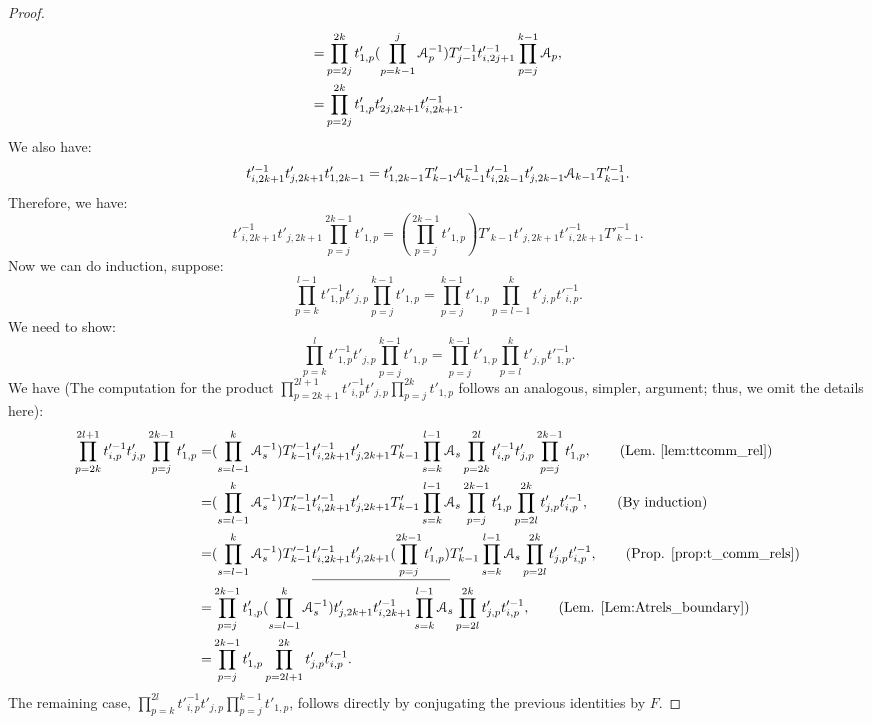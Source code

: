 \documentclass{amsart}
\begin{document}
\begin{proof}
\begin{align*}
=&\prod^{2k}_{p=2j}t'_{1,p}(\prod^{j}_{p=k-1}\AA^{-1}_p)T'^{-1}_{j-1}t'^{-1}_{i,2j+1}\prod^{k-1}_{p=j}\AA_p, \\
=&\prod^{2k}_{p=2j}t'_{1,p}t'_{2j,2k+1}t'^{-1}_{i,2k+1}.   
\end{align*}
We also have:
\[
\begin{aligned}
t'^{-1}_{i,2k+1}t'_{j,2k+1}t'_{1,2k-1}=t'_{1,2k-1}T'_{k-1}\AA^{-1}_{k-1}t'^{-1}_{i,2k-1}t'_{j,2k-1}\AA_{k-1}T'^{-1}_{k-1}.
\end{aligned}
\]
Therefore, we have:
\[
t'^{-1}_{i,2k+1}t'_{j,2k+1}\prod^{2k-1}_{p=j}t'_{1,p}=(\prod^{2k-1}_{p=j}t'_{1,p})T'_{k-1}t'_{j,2k+1}t'^{-1}_{i,2k+1}T'^{-1}_{k-1}.
\]
Now we can do induction, suppose: 
\[
\prod^{l-1}_{p=k}t'^{-1}_{1,p}t'_{j,p}\prod^{k-1}_{p=j}t'_{1,p}=\prod^{k-1}_{p=j}t'_{1,p}\prod^{k}_{p=l-1}t'_{j,p}t'^{-1}_{i,p}.
\]
We need to show:
\[
\prod^{l}_{p=k}t'^{-1}_{1,p}t'_{j,p}\prod^{k-1}_{p=j}t'_{1,p}=\prod^{k-1}_{p=j}t'_{1,p}\prod^{k}_{p=l}t'_{j,p}t'^{-1}_{1,p}.    
\]
We have (The computation for the product $\prod^{2l+1}_{p=2k+1}t'^{-1}_{i,p}t'_{j,p}\prod^{2k}_{p=j}t'_{1,p}$ follows an analogous, simpler, argument; thus, we omit the details here):
\[
\begin{aligned}
\prod^{2l+1}_{p=2k}t'^{-1}_{i,p}t'_{j,p}\prod^{2k-1}_{p=j}t'_{1,p}=&(\prod ^{k}_{s=l-1}\AA^{-1}_s)T'^{-1}_{k-1}t'^{-1}_{i,2k+1}t'_{j,2k+1}T'_{k-1}\prod ^{l-1}_{s=k}\AA_s\prod^{2l}_{p=2k}t'^{-1}_{i,p}t'_{j,p}\prod^{2k-1}_{p=j}t'_{1,p},\qquad(\text{Lem.~\ref{lem:ttcomm_rel}})\\
=&(\prod ^{k}_{s=l-1}\AA^{-1}_s)T'^{-1}_{k-1}t'^{-1}_{i,2k+1}t'_{j,2k+1}T'_{k-1}\prod ^{l-1}_{s=k}\AA_s\prod^{2k-1}_{p=j}t'_{1,p} \prod^{2k}_{p=2l}t'_{j,p}t'^{-1}_{i,p},\qquad \text{(By induction)}\\
=&(\prod ^{k}_{s=l-1}\AA^{-1}_s)T'^{-1}_{k-1}\underline{t'^{-1}_{i,2k+1}t'_{j,2k+1}(\prod^{2k-1}_{p=j}t'_{1,p})}T'_{k-1}\prod ^{l-1}_{s=k}\AA_s \prod^{2k}_{p=2l}t'_{j,p}t'^{-1}_{i,p},\qquad \text{(Prop. \ref{prop:t_comm_rels})}\\
=&\prod^{2k-1}_{p=j}t'_{1,p}(\prod ^{k}_{s=l-1}\AA^{-1}_s)t'_{j,2k+1}t'^{-1}_{i,2k+1}\prod ^{l-1}_{s=k}\AA_s \prod^{2k}_{p=2l}t'_{j,p}t'^{-1}_{i,p}, \qquad \text{(Lem. \ref{Lem:Atrels_boundary})}\\
=&\prod^{2k-1}_{p=j}t'_{1,p}\prod^{2k}_{p=2l+1}t'_{j,p}t'^{-1}_{i,p}.
\end{aligned}
\]
The remaining case,  $\prod^{2l}_{p=k}t'^{-1}_{i,p}t'_{j,p}\prod^{k-1}_{p=j}t'_{1,p}$, follows directly by conjugating the previous identities by $F$.
\end{proof}
\end{document}
